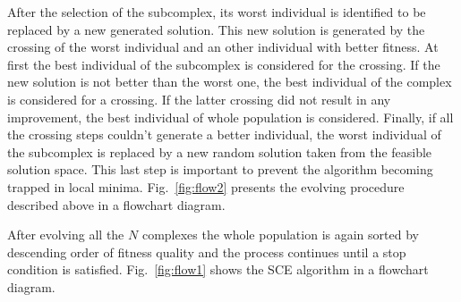 After the selection of the subcomplex, its worst individual is identified to
be replaced by a new generated solution.
This new solution is generated by the crossing of the worst individual and an
other individual with better fitness.
At first the best individual of the subcomplex is considered for the crossing.
If the new solution is not better than the worst one, the best individual
of the complex is considered for a crossing.
If the latter crossing did not result in any improvement, the best individual
of whole population is considered.
Finally, if all the crossing steps couldn't generate a better individual,
the worst individual of the subcomplex is replaced by a new random solution taken
from the feasible solution space.
This last step is important to prevent the algorithm becoming trapped in local minima.
Fig.~\ref{fig:flow2} presents the evolving procedure described above in a flowchart diagram.

After evolving all the $N$ complexes the whole population is again
sorted by descending order of fitness quality and the process continues until
a stop condition is satisfied.
Fig.~\ref{fig:flow1} shows the SCE algorithm in a flowchart diagram.

